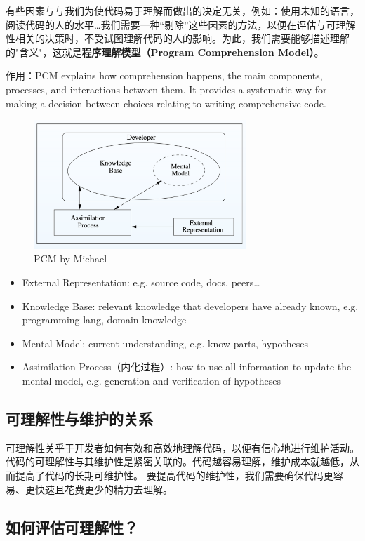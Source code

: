 有些因素与与我们为使代码易于理解而做出的决定无关，例如：使用未知的语言，阅读代码的人的水平\dots 我们需要一种“剔除”这些因素的方法，以便在评估与可理解性相关的决策时，不受试图理解代码的人的影响。为此，我们需要能够描述理解的"含义"，这就是\textbf{程序理解模型（Program Comprehension Model）}。

作用：PCM explains how comprehension happens, the main components, processes, and interactions between them. It provides a systematic way for making a decision between choices relating to writing comprehensive code.

\begin{figure}[h]
    \centering
    \includegraphics[width=8cm]{res/PCM.png}
    \caption{PCM by Michael}
\end{figure}

\begin{itemize}
    \item External Representation: e.g. source code, docs, peers\dots
    \item Knowledge Base: relevant knowledge that developers have already known, e.g. programming lang, domain knowledge
    \item Mental Model: current understanding, e.g. know parts, hypotheses
    \item Assimilation Process（内化过程）: how to use all information to update the mental model, e.g. generation and verification of hypotheses
\end{itemize}

\subsection{可理解性与维护的关系}
可理解性关乎于开发者如何有效和高效地理解代码，以便有信心地进行维护活动。代码的可理解性与其维护性是紧密关联的。代码越容易理解，维护成本就越低，从而提高了代码的长期可维护性。
要提高代码的维护性，我们需要确保代码更容易、更快速且花费更少的精力去理解。

\subsection{如何评估可理解性？}

